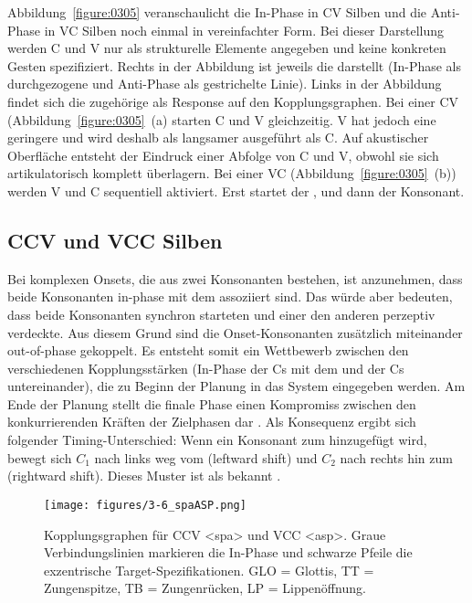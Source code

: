 Abbildung~\ref{figure:0305} veranschaulicht die In-Phase  in CV Silben und die Anti-Phase  in VC Silben noch einmal in vereinfachter Form. Bei dieser Darstellung werden C und V nur als strukturelle Elemente angegeben und keine konkreten Gesten spezifiziert. Rechts in der Abbildung ist jeweils die  darstellt (In-Phase als durchgezogene und Anti-Phase als gestrichelte Linie). Links in der Abbildung findet sich die zugehörige  als Response auf den Kopplungsgraphen. Bei einer CV  (Abbildung~\ref{figure:0305}~(a) starten C und V gleichzeitig. V hat jedoch eine geringere  und wird deshalb als  langsamer ausgeführt als C. Auf akustischer Oberfläche entsteht der Eindruck einer Abfolge von C und V, obwohl sie sich artikulatorisch komplett überlagern. Bei einer VC  (Abbildung~\ref{figure:0305}~(b)) werden V und C sequentiell aktiviert. Erst startet der , und dann der Konsonant.


\largerpage
\subsection{CCV und VCC Silben}
\label{subsec:030302}

Bei komplexen Onsets, die aus zwei Konsonanten bestehen, ist anzunehmen, dass beide Konsonanten in-phase mit dem  assoziiert sind. Das würde aber bedeuten, dass beide Konsonanten synchron starteten und einer den anderen perzeptiv verdeckte. Aus diesem Grund sind die Onset-Konsonanten zusätzlich miteinander out-of-phase gekoppelt. Es entsteht somit ein Wettbewerb zwischen den verschiedenen Kopplungsstärken (In-Phase der Cs mit dem  und  der Cs untereinander), die zu Beginn der Planung in das System eingegeben werden. Am Ende der Planung stellt die finale Phase einen Kompromiss zwischen den konkurrierenden Kräften der Zielphasen dar \citep{Goldstein2007a}. Als Konsequenz ergibt sich folgender Timing-Unterschied: Wenn ein Konsonant zum  hinzugefügt wird, bewegt sich ${C}_{1}$ nach links weg vom  (leftward shift) und ${C}_{2}$ nach rechts hin zum  (rightward shift). Dieses Muster ist als  bekannt \citep[vgl.][]{Browman1988, Browman2000, Goldstein2007a, Goldstein2009, Hermes2008a, Marin2010, Nam2007a, Nam2009b, Shaw2009}.

\begin{figure} 
	\texttt{[image: figures/3-6\_spaASP.png]}
	\caption{Kopplungsgraphen für CCV <spa> und VCC <asp>. Graue Verbindungslinien markieren die In-Phase und schwarze Pfeile die exzentrische Target-Spezifikationen. GLO = Glottis, TT = Zungenspitze, TB = Zungenrücken, LP = Lippenöffnung.}
	\label{figure:0306}
\end{figure}

